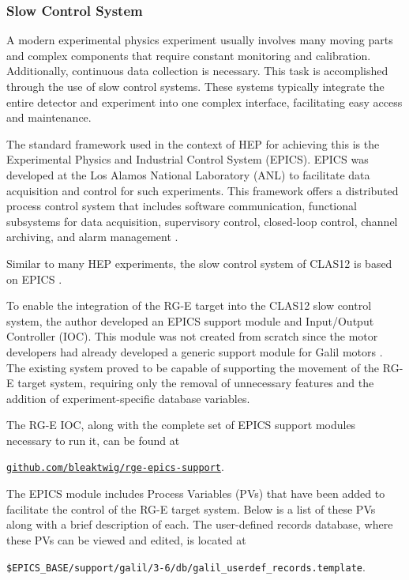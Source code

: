 \subsubsection{Slow Control System}
\label{11.310::slow_control_system}
    A modern experimental physics experiment usually involves many moving parts and complex components that require constant monitoring and calibration.
    Additionally, continuous data collection is necessary.
    This task is accomplished through the use of slow control systems.
    These systems typically integrate the entire detector and experiment into one complex interface, facilitating easy access and maintenance.

    The standard framework used in the context of HEP for achieving this is the Experimental Physics and Industrial Control System (EPICS).
    EPICS was developed at the Los Alamos National Laboratory (ANL) to facilitate data acquisition and control for such experiments.
    This framework offers a distributed process control system that includes software communication, functional subsystems for data acquisition, supervisory control, closed-loop control, channel archiving, and alarm management \cite{dalesio1991}.

    Similar to many HEP experiments, the slow control system of CLAS12 is based on EPICS \cite{boyarinov2020}.

    To enable the integration of the RG-E target into the CLAS12 slow control system, the author developed an EPICS support module and Input/Output Controller (IOC).
    This module was not created from scratch since the motor developers had already developed a generic support module for Galil motors \cite{farnswort2009}.
    The existing system proved to be capable of supporting the movement of the RG-E target system, requiring only the removal of unnecessary features and the addition of experiment-specific database variables.

    The RG-E IOC, along with the complete set of EPICS support modules necessary to run it, can be found at

    \begin{center}
        \hyperlink{github.com/bleaktwig/rge-epics-support}{\texttt{github.com/bleaktwig/rge-epics-support}}.
    \end{center}

    The EPICS module includes Process Variables (PVs) that have been added to facilitate the control of the RG-E target system.
    Below is a list of these PVs along with a brief description of each.
    The user-defined records database, where these PVs can be viewed and edited, is located at

    \begin{center}
        \texttt{\$EPICS\_BASE/support/galil/3-6/db/galil\_userdef\_records.template}.
    \end{center}

    
    
    
